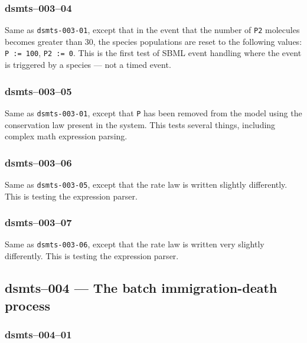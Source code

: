 
\subsubsection{dsmts--003--04} 

Same as \verb$dsmts-003-01$, except that in the event that the number
of \verb$P2$ molecules becomes greater than 30, the species
populations are reset to the following values: \verb$P := 100$, 
\verb$P2 := 0$. This is the first test of SBML event
handling where the event is triggered by a species --- not a timed event.


\subsubsection{dsmts--003--05} 

Same as \verb$dsmts-003-01$, except that \verb$P$ has been removed
from the model using the conservation law present in the system. This
tests several things, including complex math expression
parsing.


\subsubsection{dsmts--003--06} 

Same as \verb$dsmts-003-05$, except that the rate law is written
slightly differently. This is testing the expression
parser.


\subsubsection{dsmts--003--07} 

Same as \verb$dsmts-003-06$, except that the rate law is written very
slightly differently. This is testing the expression
parser.



\subsection{dsmts--004 --- The batch immigration-death process}

\subsubsection{dsmts--004--01}

